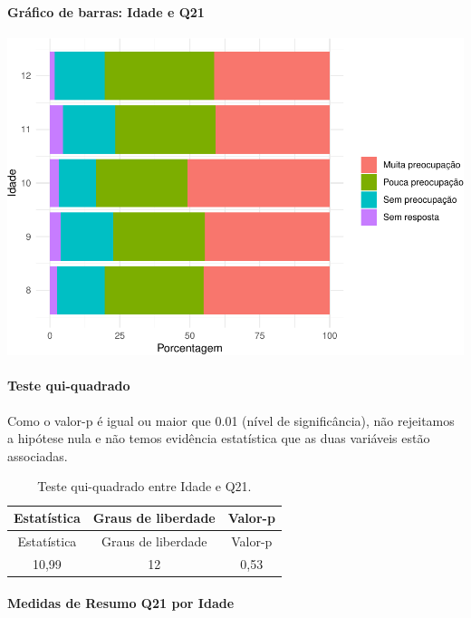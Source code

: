 \documentclass[]{article}
\let\oldparagraph\paragraph
\renewcommand{\paragraph}[1]{\oldparagraph{#1}\mbox{}}
\begin{document}
\hypertarget{gruxe1fico-de-barras-idade-e-q21}{%
\paragraph{Gráfico de barras: Idade e Q21}\label{gruxe1fico-de-barras-idade-e-q21}}

\begin{center}\includegraphics[width=0.75\linewidth]{relatorio_covid19_files/figure-latex/unnamed-chunk-447-1} \end{center}

\hypertarget{teste-qui-quadrado-39}{%
\paragraph{Teste qui-quadrado}\label{teste-qui-quadrado-39}}

Como o valor-p é igual ou maior que 0.01 (nível de significância), não rejeitamos a hipótese nula e não temos evidência estatística que as duas variáveis estão associadas.

\begin{longtable}[]{@{}ccc@{}}
\caption{\label{tab:unnamed-chunk-449}Teste qui-quadrado entre Idade e Q21.}\tabularnewline
\toprule
Estatística & Graus de liberdade & Valor-p\tabularnewline
\midrule
\endfirsthead
\toprule
Estatística & Graus de liberdade & Valor-p\tabularnewline
\midrule
\endhead
10,99 & 12 & 0,53\tabularnewline
\bottomrule
\end{longtable}

\cleardoublepage

\hypertarget{medidas-de-resumo-q21-por-idade}{%
\paragraph{Medidas de Resumo Q21 por Idade}\label{medidas-de-resumo-q21-por-idade}}
\end{document}
